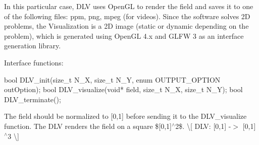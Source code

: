 In this particular case, D\+LV uses Open\+GL to render the field and saves it to one of the following files\+: ppm, png, mpeg (for videos). Since the software solves 2D problems, the Visualization is a 2D image (static or dynamic depending on the problem), which is generated using Open\+GL 4.\+x and G\+L\+FW 3 as an interface generation library.

Interface functions\+:


\begin{DoxyCode}
bool DLV\_init(size\_t N\_X, size\_t N\_Y, enum OUTPUT\_OPTION outOption);
bool DLV\_visualize(void* field, size\_t N\_X, size\_t N\_Y);
bool DLV\_terminate();
\end{DoxyCode}


The field should be normalized to \mbox{[}0,1\mbox{]} before sending it to the {\ttfamily D\+L\+V\+\_\+visualize} function. The D\+LV renders the field on a square \$\mbox{[}0,1\mbox{]}$^\wedge$2\$. \textbackslash{}\mbox{[} D\+LV\+: \mbox{[}0,1\mbox{]} -\/$>$ \mbox{[}0,1\mbox{]}$^\wedge$3 \textbackslash{}\mbox{]} 